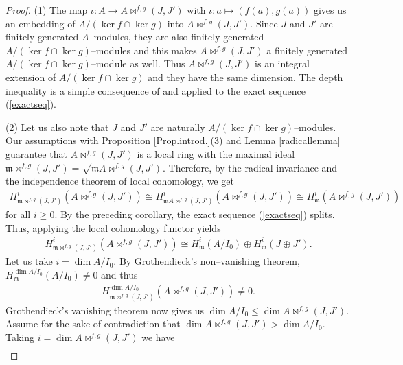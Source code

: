 \documentclass{amsart}%
\theoremstyle{plain}
\numberwithin{equation}{section}
\theoremstyle{definition}
\begin{document}
\begin{proof}
    (1) The map $\iota:A\to A\bowtie^{f,g}(J,J')$ with $\iota:a\mapsto(f(a),g(a))$ gives us an embedding of $A/(\ker f\cap \ker g)$ into $A\bowtie^{f,g}(J,J')$. Since $J$ and $J'$ are finitely generated $A$--modules, they are also finitely generated $A/(\ker f\cap \ker g)$--modules and this makes $A\bowtie^{f,g}(J,J')$ a finitely generated $A/(\ker f\cap \ker g)$--module as well. Thus $A\bowtie^{f,g}(J,J')$ is an integral extension of $A/(\ker f\cap \ker g)$ and they have the same dimension. The depth inequality is a simple consequence of \cite[Exercise 1.2.26]{brunsherzog} and \cite[Proposition 1.2.9]{brunsherzog} applied to the exact sequence (\ref{exactseq}). \medskip

        (2) Let us also note that $J$ and $J'$ are naturally $A/(\ker f\cap \ker g)$--modules. Our assumptions with Proposition \ref{Prop.introd.}(3) and Lemma \ref{radicallemma} guarantee that $ A\bowtie^{f,g}(J,J')$ is a local ring with the maximal ideal $\mathfrak{m}\bowtie^{f,g}(J,J')=\sqrt{\mathfrak{m}A\bowtie^{f,g}(J,J')}$. Therefore, by the radical invariance and the independence theorem of local cohomology, we get
        \begin{align*}
            H^i_{\mathfrak{m}\bowtie^{f,g}(J,J')}\left(A\bowtie^{f,g}(J,J')\right)\cong H^i_{\mathfrak{m} A\bowtie^{f,g}(J,J')}\left(A\bowtie^{f,g}(J,J')\right)\cong H^i_{\mathfrak{m}}\left(A\bowtie^{f,g}(J,J')\right)
        \end{align*}
        for all $i\ge 0$. By the preceding corollary, the exact sequence (\ref{exactseq}) splits. Thus, applying the local cohomology functor yields
        \begin{align}\label{maincohomisom}
            H^i_{\mathfrak{m}\bowtie^{f,g}(J,J')}\left(A\bowtie^{f,g}(J,J')\right)\cong H^i_{\mathfrak{m}}(A/I_0)\oplus H^i_{\mathfrak{m}}(J\oplus J').
        \end{align}
        Let us take $i=\dim A/I_0$. By Grothendieck's non--vanishing theorem, $H^{\dim A/I_0}_{\mathfrak{m}}(A/I_0)\neq 0$ and thus
        \begin{align*}
            H^{\dim A/I_0}_{\mathfrak{m}\bowtie^{f,g}(J,J')}\left(A\bowtie^{f,g}(J,J')\right)\neq 0.
        \end{align*} 
        Grothendieck's vanishing theorem now gives us $\dim A/I_0\le \dim A\bowtie^{f,g}(J,J')$. Assume for the sake of contradiction that $\dim A\bowtie^{f,g}(J,J')>\dim A/I_0$. Taking $i=\dim A\bowtie^{f,g}(J,J')$ we have \begin{align*}

\end{align*}
\end{proof}
\end{document}
